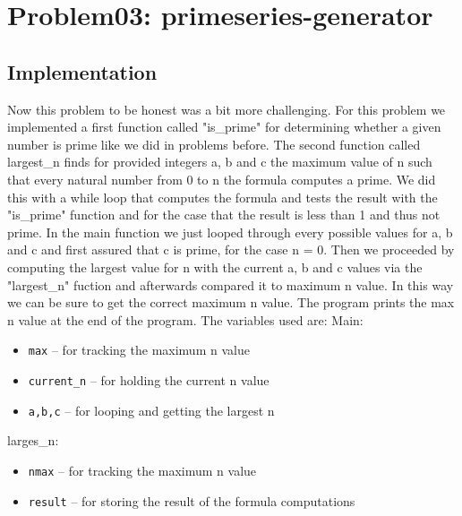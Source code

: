 \documentclass[12pt,a4paper]{article}
\begin{document}
\vspace{10em}
   
\section{Problem03: primeseries-generator}
\subsection{Implementation}
Now this problem to be honest was a bit more challenging. For this problem we implemented a first function called "is\_prime"
for determining whether a given number is prime like we did in problems before. 
\newline
The second function called largest\_n finds for 
provided integers a, b and c the maximum value of n such that every natural number from 0 to n the formula computes a prime. We 
did this with a while loop that computes the formula and tests the result with the "is\_prime" function and for the case that the
result is less than 1 and thus not prime.  
\newline
In the main function we just looped through every possible values for a, b and c and first assured that c is prime, for the case 
n = 0. Then we proceeded by computing the largest value for n with the current a, b and c values via the "largest\_n" fuction and
afterwards compared it to maximum n value. In this way we can be sure to get the correct maximum n value. The program prints the 
max n value at the end of the program.
\newline
The variables used are:
\vspace{1em}
\newline
Main:
\begin{itemize}
    \item \texttt{max} -- for tracking the maximum n value
    \item \texttt{current\_n} -- for holding the current n value
    \item \texttt{a,b,c} -- for looping and getting the largest n
\end{itemize}

\vspace{1em}
larges\_n:
\begin{itemize}
    \item \texttt{nmax} -- for tracking the maximum n value
    \item \texttt{result} -- for storing the result of the formula computations
\end{itemize}
\end{document}
